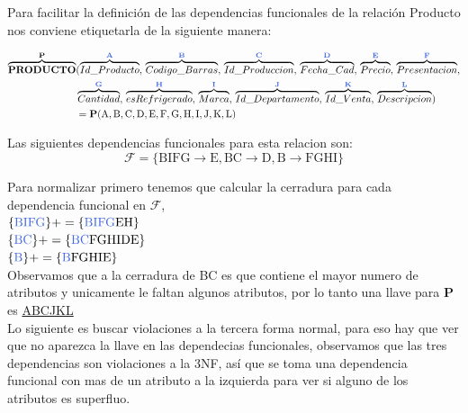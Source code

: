 \documentclass[10pt]{article}
\begin{document}
Para facilitar la definición de las dependencias funcionales de la relación Producto nos conviene etiquetarla de la siguiente manera:

\begin{align*}
\overbrace{ \textbf{PRODUCTO}}^{\textbf{{P}}}&(\overbrace{ Id\_Producto}^{\textbf{\textcolor{RoyalBlue}{A}}},\,\overbrace{Codigo\_Barras}^{\textbf{\textcolor{RoyalBlue}{B}}},\,\overbrace{Id\_Produccion}^{\textbf{\textcolor{RoyalBlue}{C}}},\,\overbrace{Fecha\_Cad}^{\textbf{\textcolor{RoyalBlue}{D}}},\,\overbrace{Precio}^{\textbf{\textcolor{RoyalBlue}{E}}},\,\overbrace{Presentacion}^{\textbf{\textcolor{RoyalBlue}{F}}},\\&\overbrace{Cantidad}^{\textbf{\textcolor{RoyalBlue}{G}}},\,\overbrace{esRefrigerado}^{\textbf{\textcolor{RoyalBlue}{H}}},\,\overbrace{Marca}^{\textbf{\textcolor{RoyalBlue}{I}}},\,\overbrace{Id\_Departamento}^{\textbf{\textcolor{RoyalBlue}{J}}},\,\overbrace{Id\_Venta}^{\textbf{\textcolor{RoyalBlue}{K}}},\,\overbrace{Descripcion}^{\textbf{\textcolor{RoyalBlue}{L}}})\\
&= \textbf{P}(\mathrm{A,B,C,D,E,F,G,H,I,J,K,L})
\end{align*}

Las siguientes dependencias funcionales para esta relacion son:\\

$$\mathcal{F}=\mathrm{\{ BIFG \rightarrow E, BC \rightarrow D, B \rightarrow FGHI \}}$$

Para normalizar primero tenemos que calcular la cerradura para cada dependencia funcional en $\mathcal{F}$,\\


$\mathrm{\{\textcolor{RoyalBlue}{BIFG}\}+= \{\textcolor{RoyalBlue}{BIFG}EH\}}$\\

$\mathrm{\{\textcolor{RoyalBlue}{BC}\}+= \{\textcolor{RoyalBlue}{BC}FGHIDE\}}$\\

$\mathrm{\{\textcolor{RoyalBlue}{B}\}+= \{\textcolor{RoyalBlue}{B}FGHIE\}}$\\


Observamos que a la cerradura de BC es que contiene el mayor numero de atributos y unicamente le faltan algunos atributos, por lo tanto una llave para \textbf{P} es \underline{ABCJKL} \\

Lo siguiente es buscar violaciones a la tercera forma normal, para eso hay que ver que no aparezca la llave en las dependecias funcionales, observamos que las tres dependencias son violaciones a la 3NF, así que se toma una dependencia funcional con mas de un atributo a la izquierda para ver si alguno de los atributos es superfluo.\\
\end{document}
